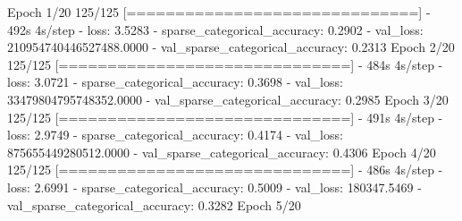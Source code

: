 \documentclass[
  12pt,
  a4paper,
]{article}
\newenvironment{Shaded}{}{}
\newcommand{\BuiltInTok}[1]{#1}
\newcommand{\DecValTok}[1]{\textcolor[rgb]{0.25,0.63,0.44}{#1}}
\newcommand{\FloatTok}[1]{\textcolor[rgb]{0.25,0.63,0.44}{#1}}
\newcommand{\NormalTok}[1]{#1}
\newcommand{\OperatorTok}[1]{\textcolor[rgb]{0.40,0.40,0.40}{#1}}
\begin{document}
\begin{Shaded}
\begin{Highlighting}[]
\NormalTok{Epoch }\DecValTok{1}\OperatorTok{/}\DecValTok{20}
\DecValTok{125}\OperatorTok{/}\DecValTok{125} \OperatorTok{[==============================]} \OperatorTok{{-}} \DecValTok{492}\BuiltInTok{s} \DecValTok{4}\BuiltInTok{s}\OperatorTok{/}\NormalTok{step }\OperatorTok{{-}}\NormalTok{ loss}\OperatorTok{:} \FloatTok{3.5283} \OperatorTok{{-}}\NormalTok{ sparse\_categorical\_accuracy}\OperatorTok{:} \FloatTok{0.2902} \OperatorTok{{-}}\NormalTok{ val\_loss}\OperatorTok{:} \FloatTok{210954740446527488.0000} \OperatorTok{{-}}\NormalTok{ val\_sparse\_categorical\_accuracy}\OperatorTok{:} \FloatTok{0.2313}
\NormalTok{Epoch }\DecValTok{2}\OperatorTok{/}\DecValTok{20}
\DecValTok{125}\OperatorTok{/}\DecValTok{125} \OperatorTok{[==============================]} \OperatorTok{{-}} \DecValTok{484}\BuiltInTok{s} \DecValTok{4}\BuiltInTok{s}\OperatorTok{/}\NormalTok{step }\OperatorTok{{-}}\NormalTok{ loss}\OperatorTok{:} \FloatTok{3.0721} \OperatorTok{{-}}\NormalTok{ sparse\_categorical\_accuracy}\OperatorTok{:} \FloatTok{0.3698} \OperatorTok{{-}}\NormalTok{ val\_loss}\OperatorTok{:} \FloatTok{33479804795748352.0000} \OperatorTok{{-}}\NormalTok{ val\_sparse\_categorical\_accuracy}\OperatorTok{:} \FloatTok{0.2985}
\NormalTok{Epoch }\DecValTok{3}\OperatorTok{/}\DecValTok{20}
\DecValTok{125}\OperatorTok{/}\DecValTok{125} \OperatorTok{[==============================]} \OperatorTok{{-}} \DecValTok{491}\BuiltInTok{s} \DecValTok{4}\BuiltInTok{s}\OperatorTok{/}\NormalTok{step }\OperatorTok{{-}}\NormalTok{ loss}\OperatorTok{:} \FloatTok{2.9749} \OperatorTok{{-}}\NormalTok{ sparse\_categorical\_accuracy}\OperatorTok{:} \FloatTok{0.4174} \OperatorTok{{-}}\NormalTok{ val\_loss}\OperatorTok{:} \FloatTok{875655449280512.0000} \OperatorTok{{-}}\NormalTok{ val\_sparse\_categorical\_accuracy}\OperatorTok{:} \FloatTok{0.4306}
\NormalTok{Epoch }\DecValTok{4}\OperatorTok{/}\DecValTok{20}
\DecValTok{125}\OperatorTok{/}\DecValTok{125} \OperatorTok{[==============================]} \OperatorTok{{-}} \DecValTok{486}\BuiltInTok{s} \DecValTok{4}\BuiltInTok{s}\OperatorTok{/}\NormalTok{step }\OperatorTok{{-}}\NormalTok{ loss}\OperatorTok{:} \FloatTok{2.6991} \OperatorTok{{-}}\NormalTok{ sparse\_categorical\_accuracy}\OperatorTok{:} \FloatTok{0.5009} \OperatorTok{{-}}\NormalTok{ val\_loss}\OperatorTok{:} \FloatTok{180347.5469} \OperatorTok{{-}}\NormalTok{ val\_sparse\_categorical\_accuracy}\OperatorTok{:} \FloatTok{0.3282}
\NormalTok{Epoch }\DecValTok{5}\OperatorTok{/}\DecValTok{20}

\end{Highlighting}
\end{Shaded}
\end{document}
